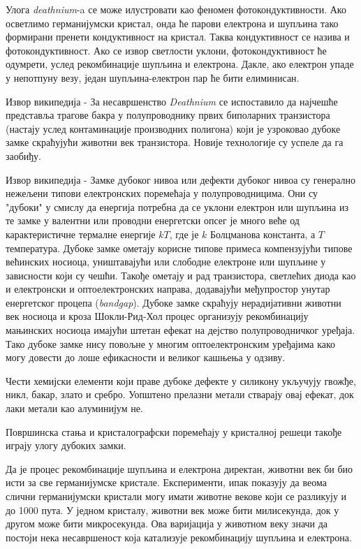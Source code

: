 \documentclass{article}
\begin{document}
Улога \textit{deathnium}-a се може илустровати као феномен фотокондуктивности. Ако осветлимо германијумски кристал, онда ће парови електрона и шупљина тако формирани пренети кондуктивност на кристал. Таква кондуктивност се назива и фотокондуктивност. Ако се извор светлости уклони, фотокондуктивност ће одумрети, услед рекомбинације шупљина и електрона. Дакле, ако електрон упаде у непотпуну везу, један шупљина-електрон пар ће бити елиминисан. 

\begin{info}
    Извор википедија - За несавршенство \textit{Deathnium} се испоставило да најчешће представља трагове бакра у полупроводнику првих биполарних транзистора (настају услед контаминације производних полигона) који је узроковао дубоке замке скраћујући животни век транзистора. Новије технологије су успеле да га заобиђу.
\end{info}

\begin{info}
	Извор википедија - Замке дубоког нивоа или дефекти дубоког нивоа су генерално нежељени типови електронских поремећаја у полупроводницима. Они су "дубоки" у смислу да енергија потребна да се уклони електрон или шупљина из те замке у валентни или проводни енергетски опсег је много веће од карактеристичне термалне енергије $kT$, где је $k$ Болцманова константа, а $T$ температура. Дубоке замке ометају корисне типове примеса компензујући типове већинских носиоца, уништавајући или слободне електроне или шупљине у зависности који су чешћи. Такође ометају и рад транзистора, светлећих диода као и електронски и оптоелектронских направа, додавајући међупростор унутар енергетског процепа (\textit{bandgap}). Дубоке замке скраћују нерадијативни животни век носиоца и кроза Шокли-Рид-Хол процес организују рекомбинацију мањинских носиоца имајући штетан ефекат на дејство полупроводничког уређаја. Тако дубоке замке нису повољне у многим оптоелектронским уређајима како могу довести до лоше ефикасности и великог кашњења у одзиву.

	Чести хемијски елементи који праве дубоке дефекте у силикону укључују гвожђе, никл, бакар, злато и сребро. Уопштено прелазни метали стварају овај ефекат, док лаки метали као алуминијум не.

	Површинска стања и кристалографски поремећају у кристалној решеци такође играју улогу дубоких замки. 
\end{info}


Да је процес рекомбинације шупљина и електрона директан, животни век би био исти за све германијумске кристале. Експерименти, ипак показују да веома слични германијумски кристали могу имати животне векове који се разликују и до 1000 пута. У једном кристалу, животни век може бити милисекунда, док у другом може бити микросекунда. Ова варијација у животном веку значи да постоји нека несавршеност која катализује рекомбинацију шупљина и електрона. 
\end{document}
